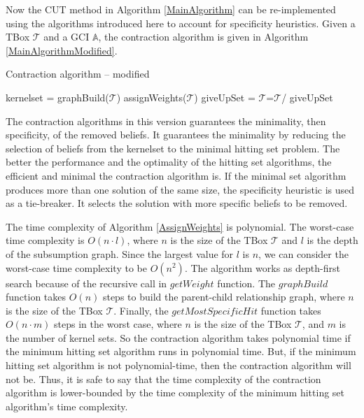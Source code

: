 Now the CUT method in Algorithm \ref{MainAlgorithm} can be re-implemented using the algorithms introduced here to account for specificity heuristics. Given a TBox $\mathcal{T}$ and a GCI $\mathbb{A}$, the contraction algorithm is given in Algorithm \ref{MainAlgorithmModified}.

\begin{algorithm}
\caption{Contraction algorithm -- modified}
\label{MainAlgorithmModified}
\begin{algorithmic}[1]
\State kernelset = 
\State graphBuild($\mathcal{T}$)
\State assignWeights($\mathcal{T}$)
\State giveUpSet = 
\State$\mathcal{T}$=$\mathcal{T}$/ giveUpSet
\EndProcedure
\end{algorithmic}
\end{algorithm}

The contraction algorithms in this version guarantees the minimality, then specificity, of the removed beliefs. It guarantees the minimality by reducing the selection of beliefs from the kernelset to the minimal hitting set problem. The better the performance and the optimality of the hitting set algorithms, the efficient and minimal the contraction algorithm is. If the minimal set algorithm produces more than one solution of the same size, the specificity heuristic is used as a tie-breaker. It selects the solution with more specific beliefs to be removed.

The time complexity of Algorithm \ref{AssignWeights} is polynomial. The worst-case time complexity is $O(n \cdot l)$, where $n$ is the size of the TBox $\mathcal{T}$ and $l$ is the depth of the subsumption graph. Since the largest value for $l$ is $n$, we can consider the worst-case time complexity to be $O(n^2)$. The algorithm works as depth-first search because of the recursive call in $getWeight$ function. The $graphBuild$ function takes $O(n)$ steps to build the parent-child relationship graph, where $n$ is the size of the TBox $\mathcal{T}$. Finally, the $getMostSpecificHit$ function takes $O(n \cdot m)$ steps in the worst case, where $n$ is the size of the TBox $\mathcal{T}$, and $m$ is the number of kernel sets. So the contraction algorithm takes polynomial time if the minimum hitting set algorithm runs in polynomial time. But, if the minimum hitting set algorithm is not polynomial-time, then the contraction algorithm will not be. Thus, it is safe to say that the time complexity of the contraction algorithm is lower-bounded by the time complexity of the minimum hitting set algorithm's time complexity.
